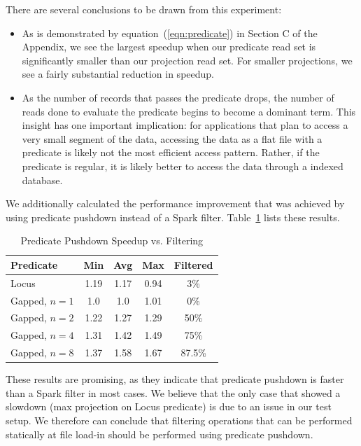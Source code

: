 \documentclass{acm_proc_article-sp}
\begin{document}
There are several conclusions to be drawn from this experiment:

\begin{itemize}
\item As is demonstrated by equation~(\ref{eqn:predicate}) in Section C of the Appendix, we see the largest speedup when our predicate read set is significantly
smaller than our projection read set. For smaller projections, we see a fairly substantial reduction in speedup.
\item As the number of records that passes the predicate drops, the number of reads done to evaluate the predicate begins to become
a dominant term. This insight has one important implication: for applications that plan to access a very small segment of the data, accessing the
data as a flat file with a predicate is likely not the most efficient access pattern. Rather, if the predicate is regular, it is likely better to access
the data through a indexed database.
\end{itemize}

We additionally calculated the performance improvement that was achieved by using predicate pushdown instead of a Spark filter.
Table~\ref{tab:filter-vs-predicate} lists these results.

\begin{table}[h]
\caption{Predicate Pushdown Speedup vs. Filtering}
\label{tab:filter-vs-predicate}
\begin{center}
\begin{tabular}{| l | c  c c | c |}
\hline
\bf Predicate & \bf Min & \bf Avg & \bf Max & \bf Filtered \\
\hline
Locus & 1.19 & 1.17 & 0.94 & 3\% \\
Gapped, $n = 1$ & 1.0 & 1.0 & 1.01 & 0\% \\
Gapped, $n = 2$ & 1.22 & 1.27 & 1.29 & 50\% \\
Gapped, $n = 4$ & 1.31 & 1.42 & 1.49 & 75\% \\
Gapped, $n = 8$ & 1.37 & 1.58 & 1.67 & 87.5\% \\
\hline
\end{tabular}
\end{center}
\end{table}

These results are promising, as they indicate that predicate pushdown is faster than a Spark filter in most cases. We believe that the
only case that showed a slowdown (max projection on Locus predicate) is due to an issue in our test setup. We therefore can conclude
that filtering operations that can be performed statically at file load-in should be performed using predicate pushdown.
\end{document}
